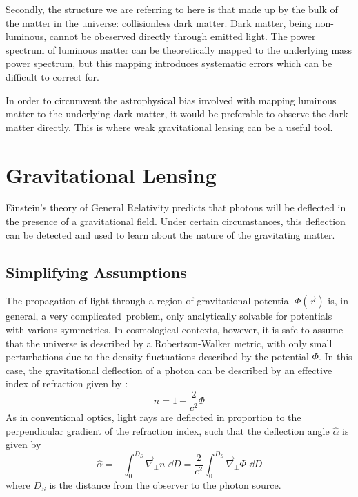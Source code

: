 Secondly, the structure we are referring to here is that made up by the bulk
of the matter in the universe: collisionless dark matter.  Dark matter,
being non-luminous, cannot be obeserved directly through emitted light.
The power spectrum of luminous matter can be theoretically mapped to the
underlying mass power spectrum, but this mapping introduces systematic
errors which can be difficult to correct for.

In order to circumvent the astrophysical bias
involved with mapping luminous matter to
the underlying dark matter, it would be preferable to observe the dark
matter directly.  This is where weak gravitational lensing can be a
useful tool.



\section{Gravitational Lensing}
\label{sec:gravitational_lensing}
Einstein's theory of General Relativity predicts that photons will be deflected
in the presence of a gravitational field.  Under certain circumstances, this
deflection can be detected and used to learn about the nature of the
gravitating matter.

\subsection{Simplifying Assumptions}
\label{sec:lensing_simplification}
The propagation of light through a region of gravitational potential
$\Phi(\vec{r})$ is, in general, a very complicated\ problem, only analytically
solvable for potentials with various symmetries.  In cosmological contexts,
however, it is safe to assume that the universe is described by a
Robertson-Walker metric, with only small perturbations due to the density
fluctuations described by the potential $\Phi$.  In this case, the
gravitational deflection of a photon can be described by an effective
index of refraction given by 
\citep[see][and references therein]{narayan1996lectures}:
\begin{equation}
  n = 1-\frac{2}{c^2}\Phi 
\end{equation}
As in conventional optics, light rays are deflected in proportion to the
perpendicular gradient of the refraction index, such that the deflection angle
$\hat{\alpha}$ is given by
\begin{equation}
  \label{eq:alpha-def}
  \hat{\alpha} = -\int_0^{D_S} \vec{\nabla}_\perp n \,\,\dd D
  = \frac{2}{c^2}\int_0^{D_S} \vec{\nabla}_\perp\Phi\,\,\dd D
\end{equation}
where $D_S$ is the distance from the observer to the photon source.  


